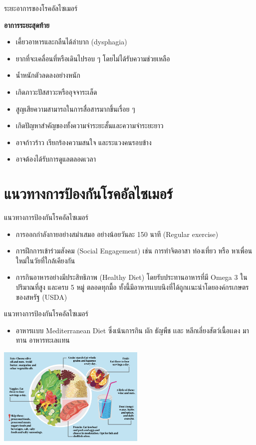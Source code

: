 \documentclass[xetex,serif]{beamer}
\begin{document}
\begin{frame}{ระยะอาการของโรคอัลไซเมอร์}

  {\Large \textbf{อาการระยะสุดท้าย}}

  \begin{itemize}
    \item เคี้ยวอาหารและกลืนได้ลำบาก (dysphagia)
    \item ยากที่จะเคลื่อนที่หรือเดินไปรอบ ๆ โดยไม่ได้รับความช่วยเหลือ
    \item น้ำหนักตัวลดลงอย่างหนัก
    \item เกิดภาวะปัสสาวะหรืออุจจาระเล็ด
    \item สูญเสียความสามารถในการสื่อสารมากขึ้นเรื่อย ๆ
    \item เกิดปัญหาสำคัญของทั้งความจำระยะสั้นและความจำระยะยาว
    \item อาจก้าวร้าว เรียกร้องความสนใจ และระแวงคนรอบข้าง
    \item อาจต้องได้รับการดูแลตลอดเวลา
  \end{itemize}
\end{frame}

\section{แนวทางการป้องกันโรคอัลไซเมอร์}

\begin{frame}{แนวทางการป้องกันโรคอัลไซเมอร์}
  \begin{itemize}
    \item การออกกําลังกายอย่างสมําเสมอ อย่างน้อยวันละ 150 นาที (Regular exercise) 
    \item การฝึกการเข้าร่วมสังคม (Social Engagement) เช่น การทําจิตอาสา ท่องเที่ยว หรือ หาเพื่อนใหม่ในวัยที่ใกล้เคียงกัน
    \item  การกินอาหารอย่างมีประสิทธิภาพ (Healthy Diet)  โดยรับประทานอาหารที่มี Omega 3 ในปริมาณที่สูง และครบ 5 หมู่ ตลอดทุกมื้อ ทั้งนี้มีอาหารเเบบนึงที่ได้ถูกเเนะนําโดยองค์กรเกษตรของสหรัฐ (USDA)
  \end{itemize}
\end{frame}

\begin{frame}{แนวทางการป้องกันโรคอัลไซเมอร์}
  \begin{itemize}
    \item อาหารเเบบ Mediterranean Diet ซึ่งเน้นการกิน ผัก ธัญพืช เเละ หลีกเลี่ยงสัตว์เนื้อเเดง มาทาน อาหารทะเลเเทน
  \end{itemize}
  \begin{center}
    \includegraphics[width=200pt]{img3.png}
  \end{center}

\end{frame}
\end{document}
